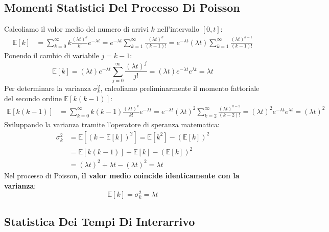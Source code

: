 \documentclass[11pt, a4paper]{article}
\begin{document}

\subsection{Momenti Statistici Del Processo Di Poisson}

Calcoliamo il valor medio del numero di arrivi $k$ nell'intervallo $[0, t]$:
\begin{align*}
    \mathbb{E}[k] &= \sum_{k=0}^{\infty} k \frac{(\lambda t)^k}{k!} e^{-\lambda t} = e^{-\lambda t} \sum_{k=1}^{\infty} \frac{(\lambda t)^k}{(k-1)!} = e^{-\lambda t} (\lambda t) \sum_{k=1}^{\infty} \frac{(\lambda t)^{k-1}}{(k-1)!}
\end{align*}
Ponendo il cambio di variabile $j = k-1$:
\[
    \mathbb{E}[k] = (\lambda t) e^{-\lambda t} \sum_{j=0}^{\infty} \frac{(\lambda t)^j}{j!} = (\lambda t) e^{-\lambda t} e^{\lambda t} = \boxed{\lambda t}
\]
Per determinare la varianza $\sigma_k^2$, calcoliamo preliminarmente il momento fattoriale del secondo ordine $\mathbb{E}[k(k-1)]$:
\begin{align*}
    \mathbb{E}[k(k-1)] &= \sum_{k=0}^{\infty} k(k-1) \frac{(\lambda t)^k}{k!} e^{-\lambda t} = e^{-\lambda t} (\lambda t)^2 \sum_{k=2}^{\infty} \frac{(\lambda t)^{k-2}}{(k-2)!} = (\lambda t)^2 e^{-\lambda t} e^{\lambda t} = (\lambda t)^2
\end{align*}
Sviluppando la varianza tramite l'operatore di speranza matematica:
\begin{align*}
    \sigma_k^2 &= \mathbb{E}[(k - \mathbb{E}[k])^2] = \mathbb{E}[k^2] - (\mathbb{E}[k])^2 \\
    &= \mathbb{E}[k(k-1)] + \mathbb{E}[k] - (\mathbb{E}[k])^2 \\
    &= (\lambda t)^2 + \lambda t - (\lambda t)^2 = \boxed{\lambda t}
\end{align*}
Nel processo di Poisson, \textbf{il valor medio coincide identicamente con la varianza}:
\[
    \boxed{\mathbb{E}[k] = \sigma_k^2 = \lambda t}
\]

\subsection{Statistica Dei Tempi Di Interarrivo}
\end{document}
